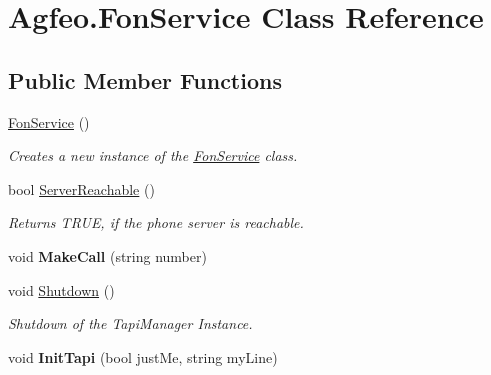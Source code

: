 \hypertarget{class_agfeo_1_1_fon_service}{}\section{Agfeo.\+Fon\+Service Class Reference}
\label{class_agfeo_1_1_fon_service}
\subsection*{Public Member Functions}
\begin{DoxyCompactItemize}
\item 
\hyperlink{class_agfeo_1_1_fon_service_a83b1dcbe08838e04da4d4cc47d23fbb7}{Fon\+Service} ()
\begin{DoxyCompactList}\small\item\em Creates a new instance of the \hyperlink{class_agfeo_1_1_fon_service}{Fon\+Service} class. \end{DoxyCompactList}\item 
bool \hyperlink{class_agfeo_1_1_fon_service_a2ce2fcba0afd52fb50f6ce4f174614d7}{Server\+Reachable} ()
\begin{DoxyCompactList}\small\item\em Returns T\+R\+UE, if the phone server is reachable. \end{DoxyCompactList}\item 
void {\bfseries Make\+Call} (string number)\hypertarget{class_agfeo_1_1_fon_service_a514b4bb9613aa86ddb809695dea77474}{}\label{class_agfeo_1_1_fon_service_a514b4bb9613aa86ddb809695dea77474}

\item 
void \hyperlink{class_agfeo_1_1_fon_service_a41207e7f308ff6c5e5ecd3145a2f8fdc}{Shutdown} ()
\begin{DoxyCompactList}\small\item\em Shutdown of the Tapi\+Manager Instance. \end{DoxyCompactList}\item 
void {\bfseries Init\+Tapi} (bool just\+Me, string my\+Line)\hypertarget{class_agfeo_1_1_fon_service_a741fad937adda30099a8be30fcfd44c2}{}\label{class_agfeo_1_1_fon_service_a741fad937adda30099a8be30fcfd44c2}

\end{DoxyCompactItemize}

